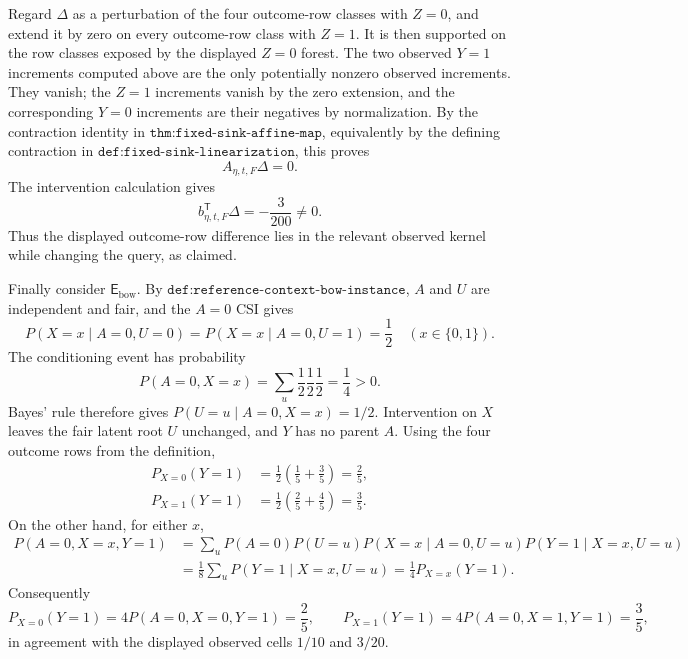 Regard \(\Delta\) as a perturbation of the four outcome-row classes with \(Z=0\), and extend it by zero on every outcome-row class with \(Z=1\).  It is then supported on the row classes exposed by the displayed \(Z=0\) forest.  The two observed \(Y=1\) increments computed above are the only potentially nonzero observed increments.  They vanish; the \(Z=1\) increments vanish by the zero extension, and the corresponding \(Y=0\) increments are their negatives by normalization.  By the contraction identity in \(\texttt{thm:fixed-sink-affine-map}\), equivalently by the defining contraction in \(\texttt{def:fixed-sink-linearization}\), this proves
\[
 A_{\eta,t,F}\Delta=0.
\]
The intervention calculation gives
\[
 b_{\eta,t,F}^{\mathsf T}\Delta=-\frac3{200}\ne0.
\]
Thus the displayed outcome-row difference lies in the relevant observed kernel while changing the query, as claimed.

Finally consider \(\mathsf E_{\mathrm{bow}}\).  By \(\texttt{def:reference-context-bow-instance}\), \(A\) and \(U\) are independent and fair, and the \(A=0\) CSI gives
\[
 P(X=x\mid A=0,U=0)=P(X=x\mid A=0,U=1)=\frac12
 \quad (x\in\{0,1\}).
\]
The conditioning event has probability
\[
 P(A=0,X=x)=\sum_u\frac12\frac12\frac12=\frac14>0.
\]
Bayes' rule therefore gives \(P(U=u\mid A=0,X=x)=1/2\).  Intervention on \(X\) leaves the fair latent root \(U\) unchanged, and \(Y\) has no parent \(A\).  Using the four outcome rows from the definition,
\[
 \begin{aligned}
 P_{X=0}(Y=1)&=\frac12\left(\frac15+\frac35\right)=\frac25,\\
 P_{X=1}(Y=1)&=\frac12\left(\frac25+\frac45\right)=\frac35.
 \end{aligned}
\]
On the other hand, for either \(x\),
\[
 \begin{aligned}
 P(A=0,X=x,Y=1)
 &=\sum_u P(A=0)P(U=u)P(X=x\mid A=0,U=u)P(Y=1\mid X=x,U=u)\\
 &=\frac18\sum_u P(Y=1\mid X=x,U=u)
 =\frac14 P_{X=x}(Y=1).
 \end{aligned}
\]
Consequently
\[
 P_{X=0}(Y=1)=4P(A=0,X=0,Y=1)=\frac25,
 \qquad
 P_{X=1}(Y=1)=4P(A=0,X=1,Y=1)=\frac35,
\]
in agreement with the displayed observed cells \(1/10\) and \(3/20\).

